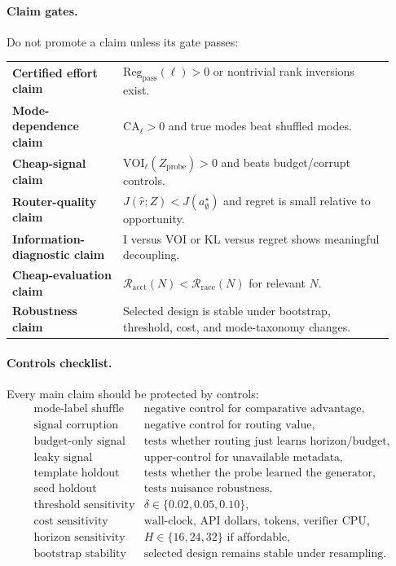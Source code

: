 \documentclass{article}
\begin{document}
\paragraph{Claim gates.}
Do not promote a claim unless its gate passes:
\begin{center}
\small
\begin{tabular}{@{}L{0.27\linewidth}L{0.66\linewidth}@{}}
    \textbf{Certified effort claim} &
    $\mathrm{Reg}_{\mathrm{pass}}(\ell)>0$ or nontrivial rank inversions exist.\\
    \textbf{Mode-dependence claim} &
    $\mathrm{CA}_\ell>0$ and true modes beat shuffled modes.\\
    \textbf{Cheap-signal claim} &
    $\mathrm{VOI}_\ell(Z_{\mathrm{probe}})>0$ and beats budget/corrupt controls.\\
    \textbf{Router-quality claim} &
    $J(\hat r;Z)<J(a^\star_{\emptyset})$ and regret is small relative to opportunity.\\
    \textbf{Information-diagnostic claim} &
    I versus VOI or KL versus regret shows meaningful decoupling.\\
    \textbf{Cheap-evaluation claim} &
    $\mathcal R_{\mathrm{acct}}(N)<\mathcal R_{\mathrm{race}}(N)$ for relevant $N$.\\
    \textbf{Robustness claim} &
    Selected design is stable under bootstrap, threshold, cost, and mode-taxonomy changes.
\end{tabular}
\end{center}

\paragraph{Controls checklist.}
Every main claim should be protected by controls:
\[
\begin{array}{ll}
    \text{mode-label shuffle} & \text{negative control for comparative advantage},\\
    \text{signal corruption} & \text{negative control for routing value},\\
    \text{budget-only signal} & \text{tests whether routing just learns horizon/budget},\\
    \text{leaky signal} & \text{upper-control for unavailable metadata},\\
    \text{template holdout} & \text{tests whether the probe learned the generator},\\
    \text{seed holdout} & \text{tests nuisance robustness},\\
    \text{threshold sensitivity} & \delta\in\{0.02,0.05,0.10\},\\
    \text{cost sensitivity} & \text{wall-clock, API dollars, tokens, verifier CPU},\\
    \text{horizon sensitivity} & H\in\{16,24,32\}\text{ if affordable},\\
    \text{bootstrap stability} & \text{selected design remains stable under resampling}.
\end{array}
\]
\end{document}
